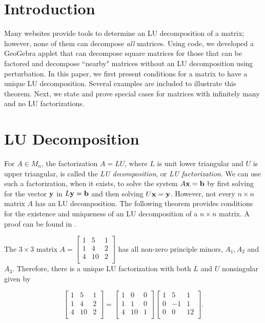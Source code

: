 \section{Introduction}
Many websites \citep{iotools2021, codesansar2021} provide tools to determine an LU  decomposition of a matrix; however, none of them can decompose \emph{all} matrices. 
Using code, we developed a GeoGebra applet that can decompose square matrices for those that can be factored and decompose ``nearby" matrices without an LU decomposition using perturbation. In this paper, we first present conditions for a  matrix to have a unique LU decomposition. Several examples are included to illustrate this theorem.  Next, we state and prove special cases for matrices with infinitely many and no LU factorizations.  \\


 
\section{LU  Decomposition}\label{sec:lu}
For $A \in M_n$, the factorization $A = LU$, where $L$ is unit lower triangular and $U$ is upper triangular,  is called the \textit{LU decomposition}, or \textit{LU factorization}.  We can use such a factorization, when it exists, to solve the system $A {\bf x} = {\bf b}$ by first solving for the vector $\bf{y}$ in $L {\bf y} = {\bf b}$ 
and then solving 
$
U {\bf x} = {\bf y}
$. 
However, not every $n \times n$ matrix $A$ has an LU decomposition.  The following theorem provides conditions for the existence and uniqueness of an LU decomposition of a $n \times n$ matrix.  A proof can be found in \citet[p. 160]{johnson1985matrix}.

  
\begin{example}\normalfont
The $3 \times 3$ matrix  
$A =  \begin{bmatrix}
1 & 5 & 1\\
1 & 4 & 2\\
4 & 10 & 2\\
\end{bmatrix}
$
has all non-zero principle minors, $A_1, A_2$ and $A_3$.  Therefore,  there is a unique LU factorization with both $L$ and $U$ nonsingular given by 
\end{example}
\[
\begin{bmatrix}
1 & 5 & 1\\
1 & 4 & 2\\
4 & 10 & 2\\
\end{bmatrix}
=
\begin{bmatrix}
1 & 0 & 0\\
1 & 1 & 0\\
4 & 10 & 1\\
\end{bmatrix}
\begin{bmatrix}
1 & 5 & 1\\
0 & -1 & 1\\
0 & 0 & 12\\
\end{bmatrix}.
\]
 
